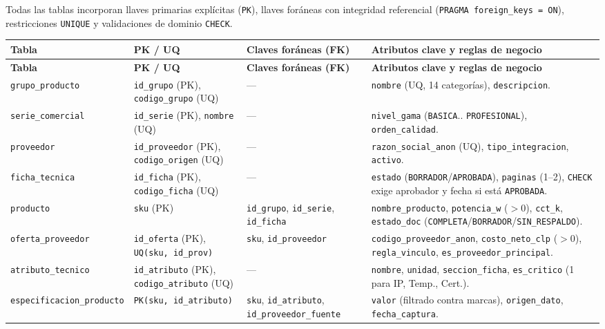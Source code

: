 \documentclass{article}
\begin{document}
Todas las tablas incorporan llaves primarias explícitas (\texttt{PK}), llaves foráneas con integridad referencial (\texttt{PRAGMA foreign\_keys = ON}), restricciones \texttt{UNIQUE} y validaciones de dominio \texttt{CHECK}.

\begin{longtable}{p{3.4cm}p{2.9cm}p{4.1cm}p{4.6cm}}
\toprule
\textbf{Tabla} & \textbf{PK / UQ} & \textbf{Claves foráneas (FK)} & \textbf{Atributos clave y reglas de negocio} \\
\midrule
\endfirsthead
\toprule
\textbf{Tabla} & \textbf{PK / UQ} & \textbf{Claves foráneas (FK)} & \textbf{Atributos clave y reglas de negocio} \\
\midrule
\endhead
\texttt{grupo\_producto} & \texttt{id\_grupo} (PK), \texttt{codigo\_grupo} (UQ) & --- & \texttt{nombre} (UQ, 14 categorías), \texttt{descripcion}. \\
\texttt{serie\_comercial} & \texttt{id\_serie} (PK), \texttt{nombre} (UQ) & --- & \texttt{nivel\_gama} (\texttt{BASICA}.. \texttt{PROFESIONAL}), \texttt{orden\_calidad}. \\
\texttt{proveedor} & \texttt{id\_proveedor} (PK), \texttt{codigo\_origen} (UQ) & --- & \texttt{razon\_social\_anon} (UQ), \texttt{tipo\_integracion}, \texttt{activo}. \\
\texttt{ficha\_tecnica} & \texttt{id\_ficha} (PK), \texttt{codigo\_ficha} (UQ) & --- & \texttt{estado} (\texttt{BORRADOR}/\texttt{APROBADA}), \texttt{paginas} (1--2), \texttt{CHECK} exige aprobador y fecha si está \texttt{APROBADA}. \\
\texttt{producto} & \texttt{sku} (PK) & \texttt{id\_grupo}, \texttt{id\_serie}, \texttt{id\_ficha} & \texttt{nombre\_producto}, \texttt{potencia\_w} ($>0$), \texttt{cct\_k}, \texttt{estado\_doc} (\texttt{COMPLETA}/\texttt{BORRADOR}/\texttt{SIN\_RESPALDO}). \\
\texttt{oferta\_proveedor} & \texttt{id\_oferta} (PK), \texttt{UQ(sku, id\_prov)} & \texttt{sku}, \texttt{id\_proveedor} & \texttt{codigo\_proveedor\_anon}, \texttt{costo\_neto\_clp} ($>0$), \texttt{regla\_vinculo}, \texttt{es\_proveedor\_principal}. \\
\texttt{atributo\_tecnico} & \texttt{id\_atributo} (PK), \texttt{codigo\_atributo} (UQ) & --- & \texttt{nombre}, \texttt{unidad}, \texttt{seccion\_ficha}, \texttt{es\_critico} (1 para IP, Temp., Cert.). \\
\texttt{especificacion\_producto} & \texttt{PK(sku, id\_atributo)} & \texttt{sku}, \texttt{id\_atributo}, \texttt{id\_proveedor\_fuente} & \texttt{valor} (filtrado contra marcas), \texttt{origen\_dato}, \texttt{fecha\_captura}. \\

\end{longtable}
\end{document}
